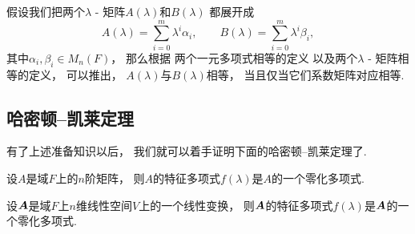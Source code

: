 假设我们把两个\(\lambda\) - 矩阵\(A(\lambda)\)和\(B(\lambda)\)
都展开成\begin{equation*}
	A(\lambda)
	= \sum_{i=0}^m \lambda^i \alpha_i,
	\qquad
	B(\lambda)
	= \sum_{i=0}^m \lambda^i \beta_i,
\end{equation*}
其中\(\alpha_i,\beta_i \in M_n(F)\)，
那么根据
两个一元多项式相等的定义
以及两个\(\lambda\) - 矩阵相等的定义，
可以推出，
\(A(\lambda)\)与\(B(\lambda)\)相等，
当且仅当它们系数矩阵对应相等.

\subsection{哈密顿--凯莱定理}
有了上述准备知识以后，
我们就可以着手证明下面的哈密顿--凯莱定理了.
\begin{theorem}
设\(A\)是域\(F\)上的\(n\)阶矩阵，
则\(A\)的特征多项式\(f(\lambda)\)是\(A\)的一个零化多项式.
\end{theorem}

\begin{corollary}
设\(\boldsymbol{A}\)是域\(F\)上\(n\)维线性空间\(V\)上的一个线性变换，
则\(\boldsymbol{A}\)的特征多项式\(f(\lambda)\)是\(\boldsymbol{A}\)的一个零化多项式.
\end{corollary}
